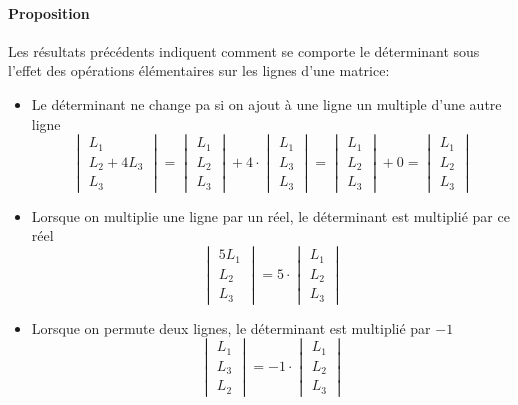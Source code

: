\paragraph{Proposition} Les résultats précédents indiquent comment se comporte le déterminant sous l'effet des opérations élémentaires sur les lignes d'une matrice:
\begin{itemize}
  \item Le déterminant ne change pa si on ajout à une ligne un multiple d'une autre ligne
    $$\begin{vmatrix} L_1 \\ L_2 + 4 L_3 \\ L_3 \end{vmatrix} 
      = \begin{vmatrix} L_1 \\ L_2 \\ L_3 \end{vmatrix} + 4 \cdot \begin{vmatrix} L_1 \\ L_3 \\ L_3 \end{vmatrix}
      = \begin{vmatrix} L_1 \\ L_2 \\ L_3 \end{vmatrix} + 0
      = \begin{vmatrix} L_1 \\ L_2 \\ L_3 \end{vmatrix}$$
      
  \item Lorsque on multiplie une ligne par un réel, le déterminant est multiplié par ce réel
    $$\begin{vmatrix} 5 L_1 \\ L_2 \\ L_3 \end{vmatrix} = 5 \cdot \begin{vmatrix} L_1 \\ L_2 \\ L_3 \end{vmatrix}$$
    
  \item Lorsque on permute deux lignes, le déterminant est multiplié par $-1$
    $$\begin{vmatrix} L_1 \\ L_3 \\ L_2 \end{vmatrix} = -1 \cdot \begin{vmatrix} L_1 \\ L_2 \\ L_3 \end{vmatrix}$$
\end{itemize}

